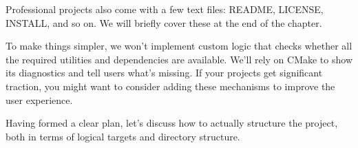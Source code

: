 Professional projects also come with a few text files: README, LICENSE, INSTALL, and so on. We will briefly cover these at the end of the chapter.

To make things simpler, we won’t implement custom logic that checks whether all the required utilities and dependencies are available. We’ll rely on CMake to show its diagnostics and tell users what’s missing. If your projects get significant traction, you might want to consider adding these mechanisms to improve the user experience.

Having formed a clear plan, let’s discuss how to actually structure the project, both in terms of logical targets and directory structure.


































